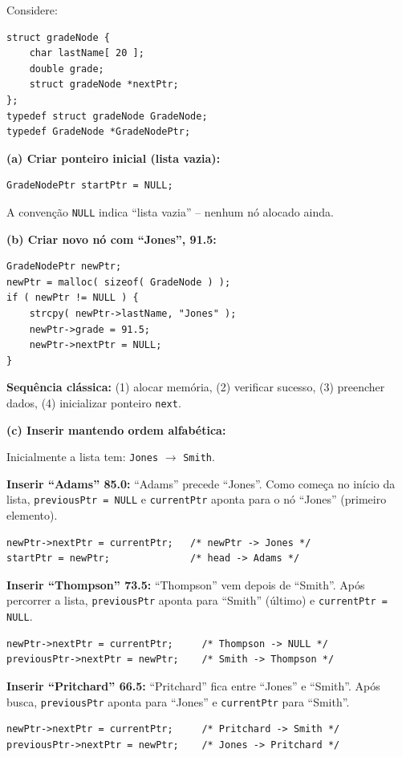 \documentclass[12pt,a4paper]{article}
\begin{document}
\begin{respostabox}
Considere:
\begin{lstlisting}
struct gradeNode {
    char lastName[ 20 ];
    double grade;
    struct gradeNode *nextPtr;
};
typedef struct gradeNode GradeNode;
typedef GradeNode *GradeNodePtr;
\end{lstlisting}

\textbf{(a) Criar ponteiro inicial (lista vazia):}
\begin{lstlisting}
GradeNodePtr startPtr = NULL;
\end{lstlisting}
A convenção \texttt{NULL} indica ``lista vazia'' -- nenhum nó alocado ainda.

\textbf{(b) Criar novo nó com ``Jones'', 91.5:}
\begin{lstlisting}
GradeNodePtr newPtr;
newPtr = malloc( sizeof( GradeNode ) );
if ( newPtr != NULL ) {
    strcpy( newPtr->lastName, "Jones" );
    newPtr->grade = 91.5;
    newPtr->nextPtr = NULL;
}
\end{lstlisting}

\textbf{Sequência clássica:} (1) alocar memória, (2) verificar sucesso, (3)
preencher dados, (4) inicializar ponteiro \texttt{next}.

\textbf{(c) Inserir mantendo ordem alfabética:}

Inicialmente a lista tem: \texttt{Jones} $\to$ \texttt{Smith}.

\textbf{Inserir ``Adams'' 85.0:}
``Adams'' precede ``Jones''. Como começa no início da lista,
\texttt{previousPtr = NULL} e \texttt{currentPtr} aponta para o nó ``Jones''
(primeiro elemento).
\begin{lstlisting}
newPtr->nextPtr = currentPtr;   /* newPtr -> Jones */
startPtr = newPtr;              /* head -> Adams */
\end{lstlisting}

\textbf{Inserir ``Thompson'' 73.5:}
``Thompson'' vem depois de ``Smith''. Após percorrer a lista,
\texttt{previousPtr} aponta para ``Smith'' (último) e \texttt{currentPtr = NULL}.
\begin{lstlisting}
newPtr->nextPtr = currentPtr;     /* Thompson -> NULL */
previousPtr->nextPtr = newPtr;    /* Smith -> Thompson */
\end{lstlisting}

\textbf{Inserir ``Pritchard'' 66.5:}
``Pritchard'' fica entre ``Jones'' e ``Smith''. Após busca,
\texttt{previousPtr} aponta para ``Jones'' e \texttt{currentPtr} para ``Smith''.
\begin{lstlisting}
newPtr->nextPtr = currentPtr;     /* Pritchard -> Smith */
previousPtr->nextPtr = newPtr;    /* Jones -> Pritchard */
\end{lstlisting}


\end{respostabox}
\end{document}
